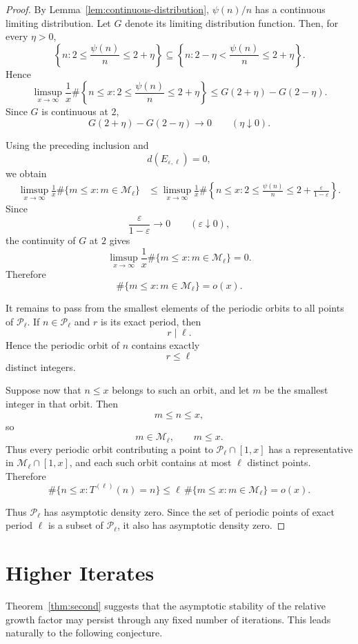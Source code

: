 \documentclass{article}
\begin{document}
\begin{proof}
By Lemma~\ref{lem:continuous-distribution}, $\psi(n)/n$ has a
continuous limiting distribution. Let $G$ denote its limiting
distribution function. Then, for every $\eta>0$,
\[
\left\{
n:
2\le\frac{\psi(n)}n\le2+\eta
\right\}
\subseteq
\left\{
n:
2-\eta<\frac{\psi(n)}n\le2+\eta
\right\}.
\]
Hence
\[
\limsup_{x\to\infty}
\frac1x
\#\left\{
n\le x:
2\le\frac{\psi(n)}n\le2+\eta
\right\}
\le
G(2+\eta)-G(2-\eta).
\]
Since $G$ is continuous at $2$,
\[
G(2+\eta)-G(2-\eta)
\longrightarrow0
\qquad(\eta\downarrow0).
\]

Using the preceding inclusion and
\[
d(E_{\varepsilon,\ell})=0,
\]
we obtain
\[
\begin{aligned}
\limsup_{x\to\infty}
\frac1x
\#\{m\le x:m\in\mathcal M_\ell\}
&\le
\limsup_{x\to\infty}
\frac1x
\#\left\{
n\le x:
2\le\frac{\psi(n)}n
\le
2+\frac{\varepsilon}{1-\varepsilon}
\right\}.
\end{aligned}
\]
Since
\[
\frac{\varepsilon}{1-\varepsilon}
\longrightarrow0
\qquad(\varepsilon\downarrow0),
\]
the continuity of $G$ at $2$ gives
\[
\limsup_{x\to\infty}
\frac1x
\#\{m\le x:m\in\mathcal M_\ell\}
=0.
\]
Therefore
\[
\#\{m\le x:m\in\mathcal M_\ell\}
=o(x).
\]

It remains to pass from the smallest elements of the periodic orbits
to all points of $\mathcal P_\ell$. If
$n\in\mathcal P_\ell$ and $r$ is its exact period, then
\[
r\mid\ell.
\]
Hence the periodic orbit of $n$ contains exactly
\[
r\le\ell
\]
distinct integers.

Suppose now that $n\le x$ belongs to such an orbit, and let $m$ be
the smallest integer in that orbit. Then
\[
m\le n\le x,
\]
so
\[
m\in\mathcal M_\ell,
\qquad
m\le x.
\]
Thus every periodic orbit contributing a point to
$\mathcal P_\ell\cap[1,x]$ has a representative in
$\mathcal M_\ell\cap[1,x]$, and each such orbit contains at most
$\ell$ distinct points. Therefore
\[
\#\{n\le x:T^{(\ell)}(n)=n\}
\le
\ell\,
\#\{m\le x:m\in\mathcal M_\ell\}
=
o(x).
\]

Thus $\mathcal P_\ell$ has asymptotic density zero. Since the set of
periodic points of exact period $\ell$ is a subset of
$\mathcal P_\ell$, it also has asymptotic density zero.
\end{proof}



\section{Higher Iterates}
\label{sec:higher}

Theorem~\ref{thm:second} suggests that the asymptotic stability of
the relative growth factor may persist through any fixed number of
iterations. This leads naturally to the following conjecture.
\end{document}
